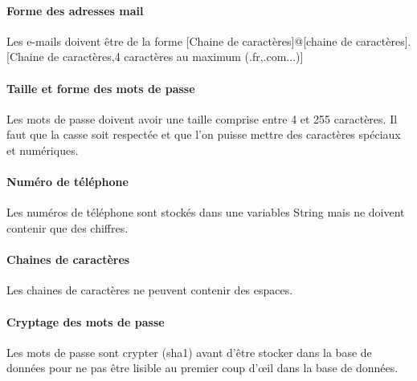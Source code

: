 \paragraph{Forme des adresses mail}

Les e-mails doivent être de la forme [Chaine de caractères]@[chaine de caractères].[Chaine de caractères,4 caractères au maximum (.fr,.com...)]

\paragraph{Taille et forme des mots de passe}

Les mots de passe doivent avoir une taille comprise entre 4 et 255 caractères. Il faut que la casse soit respectée et que l'on puisse mettre des caractères spéciaux et numériques.

\paragraph{Numéro de téléphone}

Les numéros de téléphone sont stockés dans une variables String mais ne doivent contenir que des chiffres.

\paragraph{Chaines de caractères}

Les chaines de caractères ne peuvent contenir des espaces.

\paragraph{Cryptage des mots de passe}

Les mots de passe sont crypter (sha1) avant d'être stocker dans la base de données pour ne pas être lisible au premier coup d'œil dans la base de données.